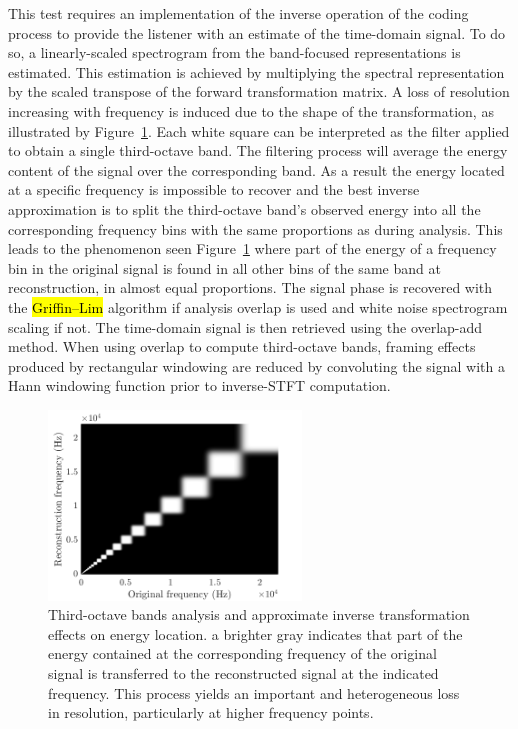 \documentclass[sensors,article,accept,moreauthors,pdftex,10pt,a4paper]{mdpi}
\DeclareRobustCommand{\fg}[1]{{\sethlcolor{cyan}\hl{#1}}}
\begin{document}
This test requires an implementation of the inverse operation of the coding process to provide the listener with an estimate of the time-domain signal. To do so, a linearly-scaled spectrogram from the band-focused representations is estimated. This estimation is achieved by multiplying the spectral representation by the scaled transpose of the forward transformation matrix. A loss of resolution increasing with frequency is induced due to the shape of the transformation, as illustrated by Figure~\ref{fig:freq}. Each white square can be interpreted as the filter applied to obtain a single third-octave band. The filtering process will average the energy content of the signal over the corresponding band. As a result the energy located at a specific frequency is impossible to recover and the best inverse approximation is to split the third-octave band's observed energy into all the corresponding frequency bins with the same proportions as during analysis. This leads to the phenomenon seen  Figure~\ref{fig:freq} where part of the energy of a frequency bin in the original signal is found in all other bins of the same band at reconstruction, in almost equal proportions. The signal phase is recovered with the \fg{Griffin--Lim} algorithm \cite{griffin1984} if analysis overlap is used and white noise spectrogram scaling if not. The time-domain signal is then retrieved using the overlap-add method. When using overlap to compute third-octave bands, framing effects produced by rectangular windowing are reduced by convoluting the signal with a Hann windowing function prior to inverse-STFT computation.


\begin{figure}[H]
	\centering
		\includegraphics[width=0.6\textwidth]{figures/freq.png}
	\caption{Third-octave bands analysis and approximate inverse transformation effects on energy location.  a brighter gray indicates that part of the energy contained at the corresponding frequency of the original signal is transferred to the reconstructed signal at the indicated frequency. This process yields an important and heterogeneous loss in resolution, particularly at higher frequency points.}
	\label{fig:freq}
\end{figure}
\end{document}
